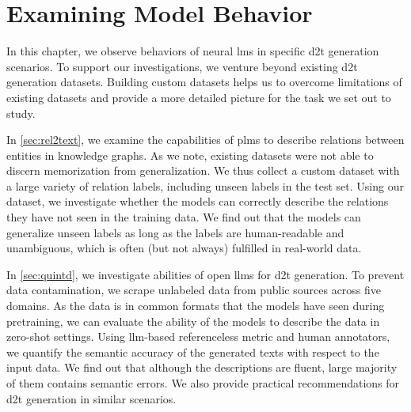 
\chapter{Examining Model Behavior}
\label{chap:investigating}

In this chapter, we observe behaviors of neural \acp{lm} in specific \ac{d2t} generation scenarios. To support our investigations, we venture beyond existing \ac{d2t} generation datasets.
Building custom datasets helps us to overcome limitations of existing datasets and provide a more detailed picture for the task we set out to study.

In \autoref{sec:rel2text}, we examine the capabilities of \acp{plm} to describe relations between entities in knowledge graphs. As we note, existing datasets were not able to discern memorization from generalization. We thus collect a custom dataset with a large variety of relation labels, including unseen labels in the test set. Using our dataset, we investigate whether the models can correctly describe the relations they have not seen in the training data. We find out that the models can generalize unseen labels as long as the labels are human-readable and unambiguous, which is often (but not always) fulfilled in real-world data.

In \autoref{sec:quintd}, we investigate abilities of open \acp{llm} for \ac{d2t} generation. To prevent data contamination, we scrape unlabeled data from public sources across five domains. As the data is in common formats that the models have seen during pretraining, we can evaluate the ability of the models to describe the data in zero-shot settings. Using \ac{llm}-based referenceless metric and human annotators, we quantify the semantic accuracy of the generated texts with respect to the input data. We find out that although the descriptions are fluent, large majority of them contains semantic errors. We also provide practical recommendations for \ac{d2t} generation in similar scenarios.

